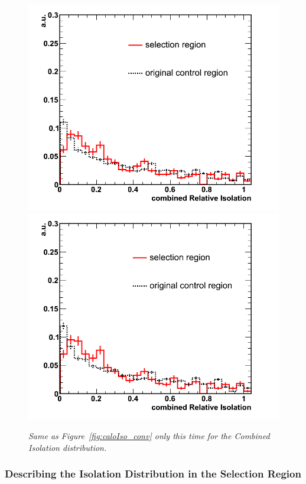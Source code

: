 \begin{figure}[h!]
\centering
\includegraphics[scale=0.32]{Plots/combIso_pt10_conv.png}
\includegraphics[scale=0.32]{Plots/combIso_pt20_conv.png}
\caption{\textit{Same as Figure~\ref{fig:caloIso_conv} only this time for the Combined Isolation distribution.}}\label{fig:combIso_conv}
\end{figure}

\subsubsection{Describing the Isolation Distribution in the Selection Region}

